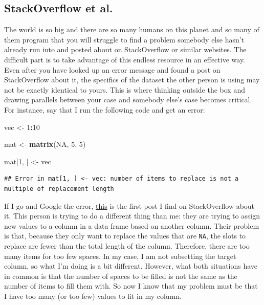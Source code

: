 \documentclass[
]{book}
\newenvironment{Shaded}{\begin{snugshade}}{\end{snugshade}}
\newcommand{\ConstantTok}[1]{\textcolor[rgb]{0.56,0.35,0.01}{#1}}
\newcommand{\DecValTok}[1]{\textcolor[rgb]{0.00,0.00,0.81}{#1}}
\newcommand{\FunctionTok}[1]{\textcolor[rgb]{0.13,0.29,0.53}{\textbf{#1}}}
\newcommand{\NormalTok}[1]{#1}
\newcommand{\OtherTok}[1]{\textcolor[rgb]{0.56,0.35,0.01}{#1}}
\newcommand{\SpecialCharTok}[1]{\textcolor[rgb]{0.81,0.36,0.00}{\textbf{#1}}}
\begin{document}
\hypertarget{stackoverflow-et-al.}{%
\subsection{StackOverflow et al.}\label{stackoverflow-et-al.}}

The world is so big and there are so many humans on this planet and so many of
them program that you will struggle to find a problem somebody else hasn't
already run into and posted about on StackOverflow or similar websites. The
difficult part is to take advantage of this endless resource in an effective way.
Even after you have looked up an error message and found a post on StackOverflow
about it, the specifics of the dataset the other person is using may not be
exactly identical to yours. This is where thinking outside the box and drawing
parallels between your case and somebody else's case becomes critical. For
instance, say that I run the following code and get an error:

\begin{Shaded}
\begin{Highlighting}[]
\NormalTok{vec }\OtherTok{\textless{}{-}} \DecValTok{1}\SpecialCharTok{:}\DecValTok{10}

\NormalTok{mat }\OtherTok{\textless{}{-}} \FunctionTok{matrix}\NormalTok{(}\ConstantTok{NA}\NormalTok{, }\DecValTok{5}\NormalTok{, }\DecValTok{5}\NormalTok{)}

\NormalTok{mat[}\DecValTok{1}\NormalTok{, ] }\OtherTok{\textless{}{-}}\NormalTok{ vec}
\end{Highlighting}
\end{Shaded}

\begin{verbatim}
## Error in mat[1, ] <- vec: number of items to replace is not a multiple of replacement length
\end{verbatim}

If I go and Google the error, \href{https://stackoverflow.com/questions/38738347/why-do-i-get-number-of-items-to-replace-is-not-a-multiple-of-replacement-length}{this} is the first post I find on StackOverflow about it. This person is trying to do a different thing than me:
they are trying to assign new values to a column in a data frame based on another
column. Their problem is that, because they only want to replace the values that
are \texttt{NA}, the slots to replace are fewer than the total length of the column.
Therefore, there are too many items for too few spaces. In my case, I am not
subsetting the target column, so what I'm doing is a bit different. However,
what both situations have in common is that the number of spaces to be filled
is not the same as the number of items to fill them with. So now I know that my
problem must be that I have too many (or too few) values to fit in my column.
\end{document}
